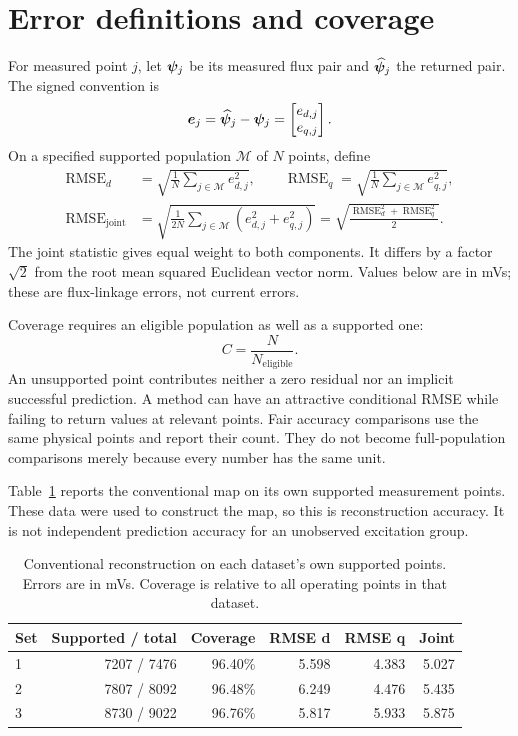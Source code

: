 \section{Error definitions and coverage}

For measured point $j$, let $\bm\psi_j$ be its measured flux pair and $\widehat{\bm\psi}_j$ the returned pair. The signed convention is
\begin{equation}
\bm e_j=\widehat{\bm\psi}_j-\bm\psi_j
=\begin{bmatrix}e_{d,j}\\e_{q,j}\end{bmatrix}.
\end{equation}
On a specified supported population $\mathcal M$ of $N$ points, define
\begin{align}
\operatorname{RMSE}_d&=\sqrt{\frac1N\sum_{j\in\mathcal M}e_{d,j}^2},\qquad
\operatorname{RMSE}_q=\sqrt{\frac1N\sum_{j\in\mathcal M}e_{q,j}^2},\\
\operatorname{RMSE}_{\mathrm{joint}}
&=\sqrt{\frac1{2N}\sum_{j\in\mathcal M}(e_{d,j}^2+e_{q,j}^2)}
=\sqrt{\frac{\operatorname{RMSE}_d^2+\operatorname{RMSE}_q^2}{2}}.
\label{eq:joint-rmse}
\end{align}
The joint statistic gives equal weight to both components. It differs by a factor $\sqrt2$ from the root mean squared Euclidean vector norm. Values below are in mVs; these are flux-linkage errors, not current errors.

Coverage requires an eligible population as well as a supported one:
\begin{equation}
C=\frac{N}{N_{\mathrm{eligible}}}.
\end{equation}
An unsupported point contributes neither a zero residual nor an implicit successful prediction. A method can have an attractive conditional RMSE while failing to return values at relevant points. Fair accuracy comparisons use the same physical points and report their count. They do not become full-population comparisons merely because every number has the same unit.

Table~\ref{tab:conventional-reconstruction} reports the conventional map on its own supported measurement points. These data were used to construct the map, so this is reconstruction accuracy. It is not independent prediction accuracy for an unobserved excitation group.

\begin{table}[htbp]
\centering\small
\caption{Conventional reconstruction on each dataset's own supported points. Errors are in mVs. Coverage is relative to all operating points in that dataset.}
\label{tab:conventional-reconstruction}
\begin{tabular}{lrrrrr}
\toprule
Set & Supported / total & Coverage & RMSE d & RMSE q & Joint\\
\midrule
1 & 7207 / 7476 & 96.40\% & 5.598 & 4.383 & 5.027\\
2 & 7807 / 8092 & 96.48\% & 6.249 & 4.476 & 5.435\\
3 & 8730 / 9022 & 96.76\% & 5.817 & 5.933 & 5.875\\
\bottomrule
\end{tabular}
\end{table}

